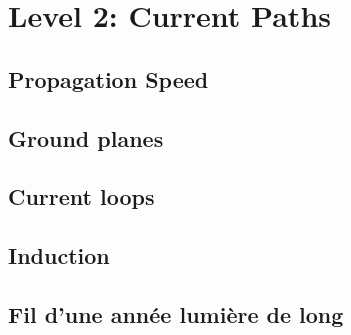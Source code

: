 
\section{Level 2: Current Paths}
\subsection{Propagation Speed}

\subsection{Ground planes}

\subsection{Current loops}

\subsection{Induction}

\subsection{Fil d'une année lumière de long}
